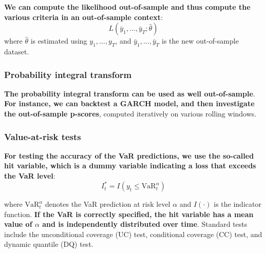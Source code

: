 \documentclass[12pt,a4paper]{article}
\begin{document}
\textbf{We can compute the likelihood out-of-sample and thus compute the various criteria in an out-of-sample context}:
\[
L(\bar{y}_1, \ldots, \bar{y}_T; \hat{\theta})
\]
where $\hat{\theta}$ is estimated using $y_1, \ldots, y_T$, and $\bar{y}_1, \ldots, \bar{y}_T$ is the new out-of-sample dataset.

\vspace{0.5em}

\subsubsection{Probability integral transform}

\textbf{The probability integral transform can be used as well out-of-sample}. \textbf{For instance, we can backtest a GARCH model, and then investigate the out-of-sample p-scores}, computed iteratively on various rolling windows.

\vspace{0.5em}

\subsubsection{Value-at-risk tests}

\textbf{For testing the accuracy of the VaR predictions, we use the so-called hit variable, which is a dummy variable indicating a loss that exceeds the VaR level}:
\[
I_t^* = I(y_t \leq \text{VaR}_t^\alpha)
\]

where $\text{VaR}_t^\alpha$ denotes the VaR prediction at risk level $\alpha$ and $I(\cdot)$ is the indicator function. \textbf{If the VaR is correctly specified, the hit variable has a mean value of $\alpha$ and is independently distributed over time}. Standard tests include the unconditional coverage (UC) test, conditional coverage (CC) test, and dynamic quantile (DQ) test.
\end{document}
